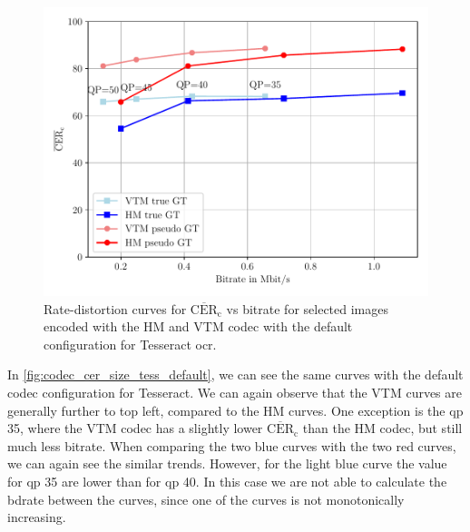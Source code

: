 \begin{figure}[h!]
    \centering
    \includegraphics[width=\textwidth]{../images/analyze/codec_cer_size_tess_default.pdf}
    \caption{Rate-distortion curves for $\overline{\text{CER}}_{\text{c}}$ vs bitrate for selected images encoded with the HM and VTM codec with the default configuration for Tesseract \gls{ocr}.}
    \label{fig:codec_cer_size_tess_default}
\end{figure}

In \autoref{fig:codec_cer_size_tess_default}, we can see the same curves with the default codec configuration for Tesseract.
We can again observe that the VTM curves are generally further to top left, compared to the HM curves.
One exception is the \gls{qp} 35, where the VTM codec has a slightly lower $\overline{\text{CER}}_{\text{c}}$ than the HM codec, but still much less bitrate.
When comparing the two blue curves with the two red curves, we can again see the similar trends.
However, for the light blue curve the value for \gls{qp} 35 are lower than for \gls{qp} 40.
In this case we are not able to calculate the \gls{bdrate} between the curves, since one of the curves is not monotonically increasing.


